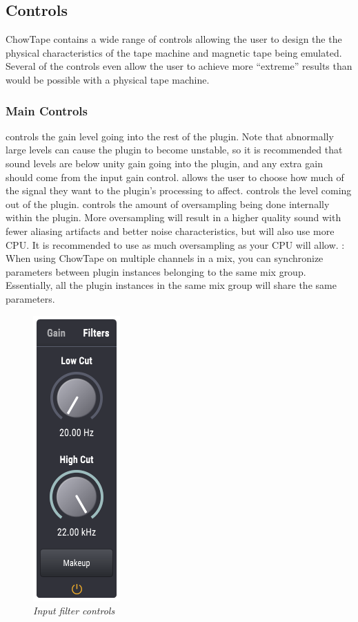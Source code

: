 \documentclass[landscape,twocolumn,a5paper]{manual}
\begin{document}
\subsection{Controls}
ChowTape contains a wide range of controls allowing the
user to design the the physical characteristics of the tape
machine and magnetic tape being emulated. Several of the
controls even allow the user to achieve more ``extreme''
results than would be possible with a physical tape machine.

\subsubsection{Main Controls}
 controls the gain level going into the
rest of the plugin. Note that abnormally large levels can
cause the plugin to become unstable, so it is recommended
that sound levels are below unity gain going into the plugin,
and any extra gain should come from the input gain control. %
\newpar
{} allows the user to choose how much of the
signal they want to the plugin's processing to affect.
\newpar
{} controls the level coming out of the plugin.
\newpar
{} controls the amount of oversampling
being done internally within the plugin. More oversampling
will result in a higher quality sound with fewer aliasing
artifacts and better noise characteristics, but will also
use more CPU. It is recommended to use as much oversampling
as your CPU will allow.
\newpar
{}: When using ChowTape on multiple channels
in a mix, you can synchronize parameters between plugin
instances belonging to the same mix group. Essentially, all
the plugin instances in the same mix group will share the same
parameters.

\begin{figure}[ht]
    \center
    \includegraphics[height=0.32\paperheight]{../Plugin/Screenshots/Filters.png}
    \caption{\label{h_inputs}{\it Input filter controls}}
\end{figure}
\end{document}
